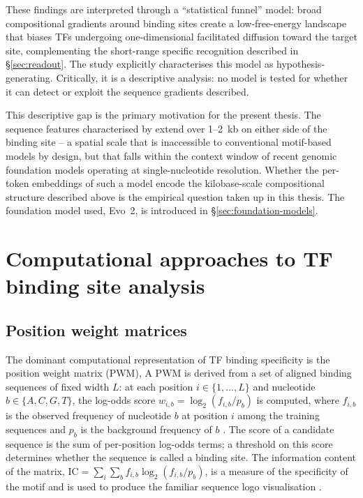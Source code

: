 These findings are interpreted through a ``statistical funnel'' model: broad compositional gradients around binding sites create a low-free-energy landscape that biases TFs undergoing one-dimensional facilitated diffusion toward the target site, complementing the short-range specific recognition described in §\ref{sec:readout}.
The study explicitly characterises this model as hypothesis-generating.
Critically, it is a descriptive analysis: no model is tested for whether it can detect or exploit the sequence gradients described.

This descriptive gap is the primary motivation for the present thesis.
The sequence features characterised by \citet{faltejskovaNonconsensusFlankingSequence2026a} extend over 1--2~kb on either side of the binding site -- a spatial scale that is inaccessible to conventional motif-based models by design, but that falls within the context window of recent genomic foundation models operating at single-nucleotide resolution.
Whether the per-token embeddings of such a model encode the kilobase-scale compositional structure described above is the empirical question taken up in this thesis.
The foundation model used, Evo~2, is introduced in §\ref{sec:foundation-models}.

\section{Computational approaches to TF binding site analysis}
\label{sec:pwm}

\subsection{Position weight matrices}

The dominant computational representation of TF binding specificity is the position weight matrix (PWM), 
A PWM is derived from a set of aligned binding sequences of fixed width $L$:
at each position $i \in \{1, \ldots, L\}$ and nucleotide $b \in \{A, C, G, T\}$, the log-odds score $w_{i,b} = \log_2 (f_{i,b} / p_b)$ is computed, where $f_{i,b}$ is the observed frequency of nucleotide $b$ at position $i$ among the training sequences and $p_b$ is the background frequency of $b$ \cite{stormoDNABindingSites2000}.
The score of a candidate sequence is the sum of per-position log-odds terms;
a threshold on this score determines whether the sequence is called a binding site.
The information content of the matrix, $\mathrm{IC} = \sum_{i} \sum_b f_{i,b} \log_2(f_{i,b}/p_b)$, is a measure of the specificity of the motif and is used to produce the familiar sequence logo visualisation \cite{schneiderSequenceLogosNew1990}.

